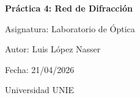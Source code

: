 \documentclass[12pt,a4paper]{article}
\begin{document}
\begin{titlepage}
    \centering
    \vspace*{3cm}
    {\LARGE\bfseries Práctica 4: Red de Difracción\par}
    \vspace{1.2cm}
    {\large Asignatura: Laboratorio de Óptica\par}
    \vspace{0.4cm}
    {\large Autor: Luis López Nasser\par}
    \vspace{0.2cm}
    {\large Fecha: 21/04/2026\par}
    \vspace{0.2cm}
    {\large Universidad UNIE\par}
    \vfill
\end{titlepage}

\tableofcontents
\clearpage
\end{document}
